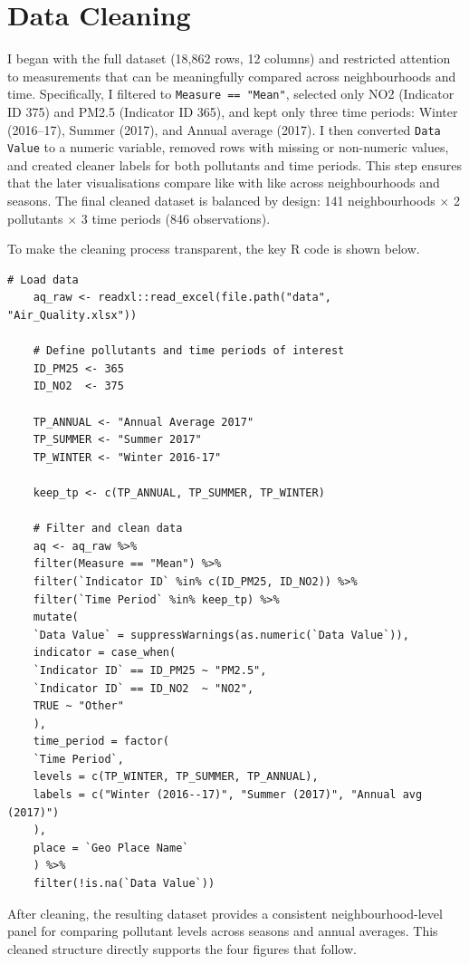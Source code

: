 \documentclass[11pt,a4paper]{article}
\begin{document}
\section*{Data Cleaning}

I began with the full dataset (18,862 rows, 12 columns) and restricted attention to measurements that can be meaningfully compared across neighbourhoods and time. Specifically, I filtered to \texttt{Measure == "Mean"}, selected only NO2 (Indicator ID 375) and PM2.5 (Indicator ID 365), and kept only three time periods: Winter (2016--17), Summer (2017), and Annual average (2017). I then converted \texttt{Data Value} to a numeric variable, removed rows with missing or non-numeric values, and created cleaner labels for both pollutants and time periods. This step ensures that the later visualisations compare like with like across neighbourhoods and seasons. The final cleaned dataset is balanced by design: 141 neighbourhoods $\times$ 2 pollutants $\times$ 3 time periods (846 observations).

To make the cleaning process transparent, the key R code is shown below.

\begin{lstlisting}[style=rcode, caption={Key R code for data cleaning and variable preparation}]
	# Load data
	aq_raw <- readxl::read_excel(file.path("data", "Air_Quality.xlsx"))
	
	# Define pollutants and time periods of interest
	ID_PM25 <- 365
	ID_NO2  <- 375
	
	TP_ANNUAL <- "Annual Average 2017"
	TP_SUMMER <- "Summer 2017"
	TP_WINTER <- "Winter 2016-17"
	
	keep_tp <- c(TP_ANNUAL, TP_SUMMER, TP_WINTER)
	
	# Filter and clean data
	aq <- aq_raw %>%
	filter(Measure == "Mean") %>%
	filter(`Indicator ID` %in% c(ID_PM25, ID_NO2)) %>%
	filter(`Time Period` %in% keep_tp) %>%
	mutate(
	`Data Value` = suppressWarnings(as.numeric(`Data Value`)),
	indicator = case_when(
	`Indicator ID` == ID_PM25 ~ "PM2.5",
	`Indicator ID` == ID_NO2  ~ "NO2",
	TRUE ~ "Other"
	),
	time_period = factor(
	`Time Period`,
	levels = c(TP_WINTER, TP_SUMMER, TP_ANNUAL),
	labels = c("Winter (2016--17)", "Summer (2017)", "Annual avg (2017)")
	),
	place = `Geo Place Name`
	) %>%
	filter(!is.na(`Data Value`))
\end{lstlisting}

After cleaning, the resulting dataset provides a consistent neighbourhood-level panel for comparing pollutant levels across seasons and annual averages. This cleaned structure directly supports the four figures that follow.
	
\end{document}

